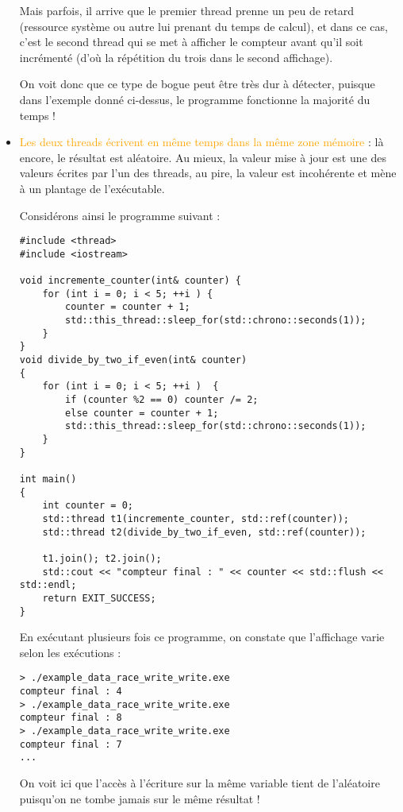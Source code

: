 \documentclass[fleqn,11pt]{article}
\begin{document}
\begin{itemize}
Mais parfois, il arrive que le premier thread prenne un peu de retard (ressource système ou autre lui prenant du temps de calcul), et dans ce cas, c'est le second thread qui se met à afficher le compteur avant qu'il soit
incrémenté (d'où la répétition du trois dans le second affichage).

On voit donc que ce type de bogue peut être très dur à détecter, puisque dans l'exemple donné ci-dessus,
le programme fonctionne la majorité du temps !

\item \textcolor{orange}{Les deux threads écrivent en même temps dans la même zone mémoire} : là encore, le résultat est aléatoire. Au mieux, la valeur mise à jour est une des valeurs écrites par l'un des threads, au pire, la valeur est incohérente et mène à un plantage de l'exécutable.

Considérons ainsi le programme suivant :
\begin{lstlisting}
#include <thread>
#include <iostream>

void incremente_counter(int& counter) {
    for (int i = 0; i < 5; ++i ) {
        counter = counter + 1;
        std::this_thread::sleep_for(std::chrono::seconds(1));
    }
}
void divide_by_two_if_even(int& counter)
{
    for (int i = 0; i < 5; ++i )  {
        if (counter %2 == 0) counter /= 2;
        else counter = counter + 1;
        std::this_thread::sleep_for(std::chrono::seconds(1));
    }
}

int main()
{
    int counter = 0;
    std::thread t1(incremente_counter, std::ref(counter));
    std::thread t2(divide_by_two_if_even, std::ref(counter));

    t1.join(); t2.join();
    std::cout << "compteur final : " << counter << std::flush << std::endl;
    return EXIT_SUCCESS;    
}
\end{lstlisting}
En exécutant plusieurs fois ce programme, on constate que l'affichage varie selon les exécutions :
\begin{verbatim}
> ./example_data_race_write_write.exe
compteur final : 4
> ./example_data_race_write_write.exe
compteur final : 8
> ./example_data_race_write_write.exe
compteur final : 7
...
\end{verbatim}

On voit ici que l'accès à l'écriture sur la même variable tient de l'aléatoire puisqu'on ne tombe jamais sur le même résultat !
\end{itemize}
\end{document}
